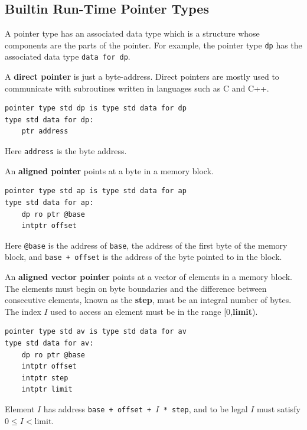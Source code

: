 \documentclass[12pt]{article}
\newcommand{\key}[1]{{\rm \bfseries #1}}
\newenvironment{indpar}[1][0.3in]%
	{\begin{list}{}%
		     {\setlength{\itemsep}{0in}%
		      \setlength{\topsep}{0in}%
		      \setlength{\parsep}{1ex}%
		      \setlength{\labelwidth}{#1}%
		      \setlength{\leftmargin}{#1}%
		      \addtolength{\leftmargin}{\labelsep}}%
	 \item}%
	{\end{list}}
\begin{document}
\subsection{Builtin Run-Time Pointer Types}
\label{BUILTIN-RUN-TIME-POINTER-TYPES}

A pointer type has an associated data type which is a structure
whose components are the parts of the pointer.  For example, the
pointer type {\tt dp} has the associated data type {\tt data for dp}.

\begin{description}
\item[\key{dp}] A \key{direct pointer} is just a byte-address.
Direct pointers are mostly used to communicate with subroutines written
in languages such as C and C++.
\begin{indpar}\begin{verbatim}
pointer type std dp is type std data for dp
type std data for dp:
    ptr address
\end{verbatim}\end{indpar}
Here {\tt address} is the byte address.

\item[\key{ap}] An \key{aligned pointer} points at a byte in a memory block.
\begin{indpar}\begin{verbatim}
pointer type std ap is type std data for ap
type std data for ap:
    dp ro ptr @base
    intptr offset
\end{verbatim}\end{indpar}
Here {\tt @base} is the address of {\tt base}, the address of the first
byte of the memory block, and {\tt base + offset} is
the address of the byte pointed to in the block.

\item[\key{av}] An \key{aligned vector pointer} points at a vector
of elements in a memory block.  The elements must begin on byte boundaries
and the difference between consecutive elements, known as the \key{step},
must be an integral
number of bytes.  The index $I$ used to access an element must be
in the range [0,\key{limit}).
\begin{indpar}\begin{verbatim}
pointer type std av is type std data for av
type std data for av:
    dp ro ptr @base
    intptr offset
    intptr step
    intptr limit
\end{verbatim}\end{indpar}
Element $I$ has address {\tt base + offset + $I$ * step}, and to be
legal $I$ must satisfy $0\le I < \mathrm{limit}$.


\end{description}
\end{document}
